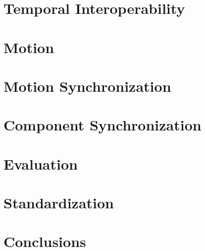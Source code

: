 \documentclass[graybox]{svmult}
\begin{document}
\section{Temporal Interoperability}
\label{sec:interoperability}


\section{Motion}
\label{sec:motion}


\section{Motion Synchronization}
\label{sec:motionsync}


\section{Component Synchronization}
\label{sec:compsync}


\section{Evaluation}
\label{sec:eval}


\section{Standardization}
\label{sec:standard}


\section{Conclusions}
\label{sec:concl}



 
\end{document}
